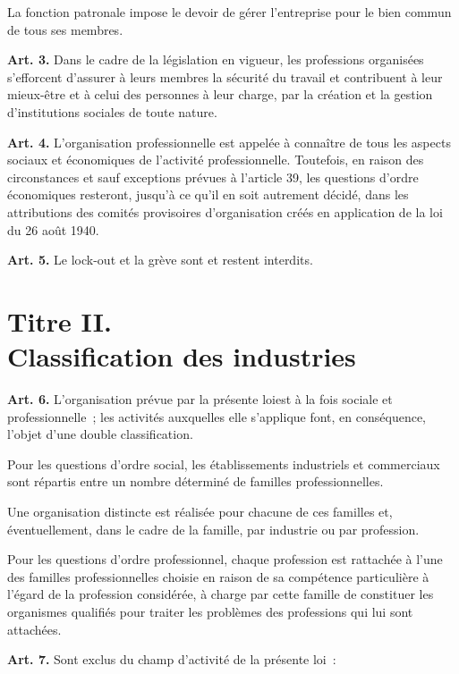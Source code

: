 \documentclass[french,twoside]{book} %
\newcommand{\labelchar}[1]{\textbf{\color{rubric} #1}}
\def\mednobreak{\ifdim\lastskip<\medskipamount
  \removelastskip\nopagebreak\medskip\fi}
\newcommand{\labelblock}[1]{\medbreak{\noindent\color{rubric}\bfseries #1}\par\mednobreak}
\begin{document}
La fonction patronale impose le devoir de gérer l’entreprise pour le bien commun de tous ses membres.\par
\bigbreak
\noindent \labelchar{Art. 3.} Dans le cadre de la législation en vigueur, les professions organisées s’efforcent d’assurer à leurs membres la sécurité du travail et contribuent à leur mieux-être et à celui des personnes à leur charge, par la création et la gestion d’institutions sociales de toute nature.\par
\bigbreak
\noindent \labelchar{Art. 4.} L’organisation professionnelle est appelée à connaître de tous les aspects sociaux et économiques de l’activité professionnelle. Toutefois, en raison des circonstances et sauf exceptions prévues à l’article 39, les questions d’ordre économiques resteront, jusqu’à ce qu’il en soit autrement décidé, dans les attributions des comités provisoires d’organisation créés en application de la loi du 26 août 1940.\par
\bigbreak
\noindent \labelchar{Art. 5.} Le lock-out et la grève sont et restent interdits.

\section[{Titre II. Classification des industries}]{Titre II. \\
Classification des industries}
\renewcommand{\leftmark}{Titre II. \\
Classification des industries}


\labelblock{Commerces et professions}

\noindent \labelchar{Art. 6.} L’organisation prévue par la présente loiest à la fois sociale et professionnelle ; les activités auxquelles elle s’applique font, en conséquence, l’objet d’une double classification.\par
Pour les questions d’ordre social, les établissements industriels et commerciaux sont répartis entre un nombre déterminé de familles professionnelles.\par
Une organisation distincte est réalisée pour chacune de ces familles et, éventuellement, dans le cadre de la famille, par industrie ou par profession.\par
Pour les questions d’ordre professionnel, chaque profession est rattachée à l’une des familles professionnelles choisie en raison de sa compétence particulière à l’égard de la profession considérée, à charge par cette famille de constituer les organismes qualifiés pour traiter les problèmes des professions qui lui sont attachées.\par
\bigbreak
\noindent \labelchar{Art. 7.} Sont exclus du champ d’activité de la présente loi :\par
\end{document}
